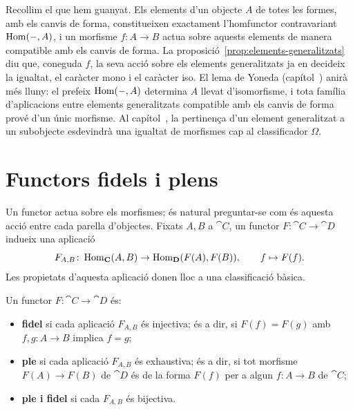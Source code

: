 Recollim el que hem guanyat. Els elements d'un objecte $A$ de totes les formes, amb els canvis de forma, constitueixen exactament l'homfunctor contravariant $\operatorname{Hom}(-,A)$, i un morfisme $f\colon A\to B$ actua sobre aquests elements de manera compatible amb els canvis de forma. La proposició~\ref{prop:elements-generalitzats} diu que, coneguda $f$, la seva acció sobre els elements generalitzats ja en decideix la igualtat, el caràcter mono i el caràcter iso. El lema de Yoneda (capítol~) anirà més lluny: el prefeix $\operatorname{Hom}(-,A)$ determina $A$ llevat d'isomorfisme, i tota família d'aplicacions entre elements generalitzats compatible amb els canvis de forma prové d'un únic morfisme. Al capítol~, la pertinença d'un element generalitzat a un subobjecte esdevindrà una igualtat de morfismes cap al classificador $\Omega$.

\section{Functors fidels i plens}


Un functor actua sobre els morfismes; és natural preguntar-se com és aquesta acció entre cada parella d'objectes. Fixats $A,B$ a $\cat{C}$, un functor $F\colon\cat{C}\to\cat{D}$ indueix una aplicació
\[
F_{A,B}\colon\operatorname{Hom}_{\mathbf{C}}(A,B)\to\operatorname{Hom}_{\mathbf{D}}(F(A),F(B)),
\qquad
f\mapsto F(f).
\]
Les propietats d'aquesta aplicació donen lloc a una classificació bàsica.

\begin{definicio}
\label{def:ple-fidel}
Un functor $F\colon\cat{C}\to\cat{D}$ és:
\begin{itemize}
\item \textbf{fidel} si cada aplicació $F_{A,B}$ és injectiva; és a dir, si $F(f)=F(g)$ amb $f,g\colon A\to B$ implica $f=g$;
\item \textbf{ple} si cada aplicació $F_{A,B}$ és exhaustiva; és a dir, si tot morfisme $F(A)\to F(B)$ de $\cat{D}$ és de la forma $F(f)$ per a algun $f\colon A\to B$ de $\cat{C}$;
\item \textbf{ple i fidel} si cada $F_{A,B}$ és bijectiva.
\end{itemize}
\end{definicio}


